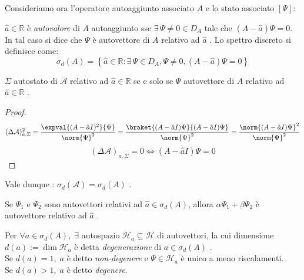 Consideriamo ora l'operatore autoaggiunto associato \(A\) e lo stato associato \([\Psi]\):
\begin{definition}
    \(\hat{a} \in \mathbb{R}\) è \textit{autovalore} di \(A\) autoaggiunto sse \(\exists \,\Psi \neq 0 \in D_A\) tale che \((A-\hat{a})\Psi=0\). \\
    In tal caso si dice che \(\Psi\) è autovettore di \(A\) relativo ad \(\hat{a}\) .
    Lo spettro discreto si definisce come:
    \[
        \sigma_d(A)  = \left\{ \hat{a} \in \mathbb{R} : \exists\, \Psi \in D_A, \Psi \neq 0 , (A-\hat{a})\Psi =0\right\}
    \]
\end{definition}

\begin{theorem}
    \(\Sigma\) autostato di \(\mathcal{A}\) relativo ad \(\hat{a} \in \mathbb{R}\) se e solo se \(\Psi\) autovettore di \(A\) relativo ad \(\hat{a} \in \mathbb{R}\) .
\end{theorem}
\begin{proof}
    \[
        (\Delta \mathcal{A})^2_{\hat{a},\Sigma}= \frac{\expval{(A-\hat{a}I)^2}{\Psi}}{\norm{\Psi}^2}= 
        \frac{\braket{(A-\hat{a}I)\Psi}{(A-\hat{a}I)\Psi}}{\norm{\Psi}^2} = \frac{\norm{(A-\hat{a}I)\Psi}^2}{\norm{\Psi}^2}
    \]
    \[
        (\Delta\mathcal{A})_{\hat{a},\Sigma} = 0 \iff (A-\hat{a}I)\Psi=0 
    \]    
\end{proof}

\begin{remark}
    Vale dunque : \(\sigma_d(\mathcal{A})= \sigma_d(A)\) .
\end{remark}

\begin{remark}
    Se \(\Psi_1\) e \(\Psi_2\) sono autovettori relativi ad \(\hat{a} \in \sigma_d(A)\), allora \(\alpha\Psi_1+ \beta\Psi_2\) è autovettore relativo ad \(\hat{a}\) .
\end{remark}
\begin{definition}
    Per \(\forall a \in \sigma_d(A) , \; \exists\) autospazio \(\mathcal{H}_a\subseteq\mathcal{H}\) di autovettori, 
    la cui dimensione \(d(a):= \operatorname{dim}\mathcal{H}_a\) è detta \textit{degenerazione} di \(a \in \sigma_d(A)\) .\\
    Se \(d(a)=1,\; a \) è detto \textit{non-degenere} e \(\Psi\in \mathcal{H}_a\) è unico a meno riscalamenti. \\Se \(d(a)>1, \; a\) è detto \textit{degenere}.
\end{definition}

